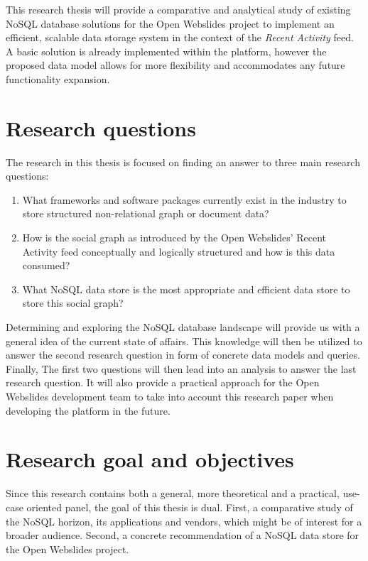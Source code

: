 This research thesis will provide a comparative and analytical study of existing NoSQL database solutions for the Open Webslides project to implement an efficient, scalable data storage system in the context of the \textit{Recent Activity} feed. A basic solution is already implemented within the platform, however the proposed data model allows for more flexibility and accommodates any future functionality expansion.

\section{Research questions}
\label{sec:research-questions}

The research in this thesis is focused on finding an answer to three main research questions:

\begin{enumerate}
  \item What frameworks and software packages currently exist in the industry to store structured non-relational graph or document data?
  \item How is the social graph as introduced by the Open Webslides' Recent Activity feed conceptually and logically structured and how is this data consumed?
  \item What NoSQL data store is the most appropriate and efficient data store to store this social graph?
\end{enumerate}

Determining and exploring the NoSQL database landscape will provide us with a general idea of the current state of affairs. This knowledge will then be utilized to answer the second research question in form of concrete data models and queries. Finally, The first two questions will then lead into an analysis to answer the last research question. It will also provide a practical approach for the Open Webslides development team to take into account this research paper when developing the platform in the future.
                                                                                                            
\section{Research goal and objectives}
\label{sec:research-goal-and-objectives}

Since this research contains both a general, more theoretical and a practical, use-case oriented panel, the goal of this thesis is dual. First, a comparative study of the NoSQL horizon, its applications and vendors, which might be of interest for a broader audience. Second, a concrete recommendation of a NoSQL data store for the Open Webslides project.

